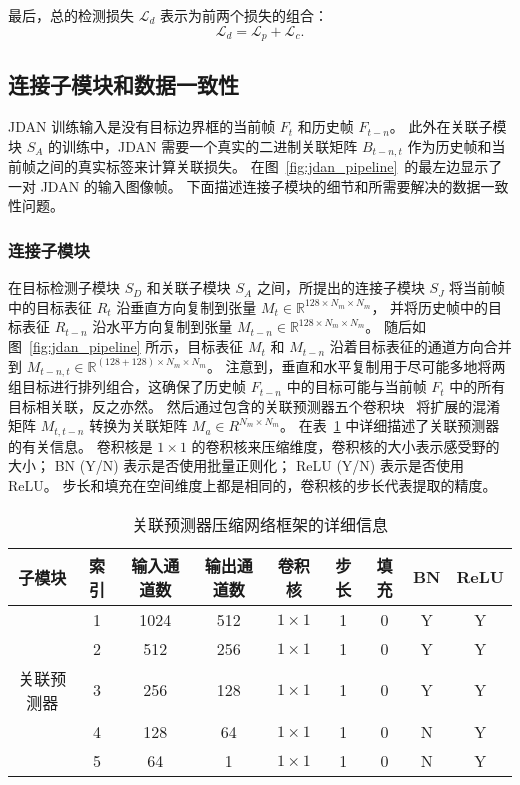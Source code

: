 最后，总的检测损失 $\mathcal{L}_{d}$ 表示为前两个损失的组合：
\begin{equation}
\mathcal{L}_{d} = \mathcal{L}_{p} + \mathcal{L}_{c}.
\end{equation}



\subsection{连接子模块和数据一致性}
JDAN 训练输入是没有目标边界框的当前帧 $F_t$ 和历史帧 $F_{t-n}$。
此外在关联子模块 $S_A$ 的训练中，JDAN 需要一个真实的二进制关联矩阵 $B_{t-n, t}$ 作为历史帧和当前帧之间的真实标签来计算关联损失。
在图~\ref{fig:jdan_pipeline}~的最左边显示了一对 JDAN 的输入图像帧。
下面描述连接子模块的细节和所需要解决的数据一致性问题。


\subsubsection{连接子模块}
在目标检测子模块 $S_D$ 和关联子模块 $S_A$ 之间，所提出的连接子模块 $S_J$ 将当前帧中的目标表征 $R_t$ 沿垂直方向复制到张量 $M_t \in \mathbb{R}^{128 \times N_m \times N_m}$，
并将历史帧中的目标表征 $R_{t-n}$ 沿水平方向复制到张量 $M_{t-n} \in \mathbb{R}^{128 \times N_m \times N_m}$。
随后如图~\ref{fig:jdan_pipeline} 所示，目标表征 $M_t$ 和 $M_{t-n}$ 沿着目标表征的通道方向合并到 $M_{t-n,t} \in \mathbb{R}^{(128 + 128) \times N_m \times N_m}$。
注意到，垂直和水平复制用于尽可能多地将两组目标进行排列组合，这确保了历史帧 $F_{t-n}$ 中的目标可能与当前帧 $F_t$ 中的所有目标相关联，反之亦然。
然后通过包含的关联预测器五个卷积块~\cite{inception} 将扩展的混淆矩阵 $M_{t,t-n}$ 转换为关联矩阵 $M_a \in R^{N_m \times N_m}$。
在表~\ref{tab:compression_net} 中详细描述了关联预测器的有关信息。
卷积核是 $1 \times 1$ 的卷积核来压缩维度，卷积核的大小表示感受野的大小； 
BN (Y/N) 表示是否使用批量正则化；
ReLU (Y/N) 表示是否使用 ReLU。
步长和填充在空间维度上都是相同的，卷积核的步长代表提取的精度。

\begin{table}[t]
	\centering
	\tabcolsep=3.5pt
	\caption{关联预测器压缩网络框架的详细信息}
	\label{tab:compression_net}
	\tabcolsep=0.15cm
	\begin{tabular}{c|cccccccc}
		\hline
		{子模块}	&{索引} &{输入通道数} &{输出通道数} &{卷积核} &{步长} & {填充} &{BN} &{ReLU} \\
		\hline
		\multirow{2}{*}{}
		&	1     & 1024  & 512  	& $1 \times 1$ 	& 1 & 0 &	Y	&	Y\\
		&	2     & 512   & 256   	& $1 \times 1$	& 1 & 0 &	Y	&	Y\\
		\multirow{1}{*}{关联预测器}
		&	3     & 256   & 128   	& $1 \times 1$ 	& 1 & 0 &	Y	&	Y\\
		\multirow{1}{*}{}
		&	4     & 128   & 64   	& $1 \times 1$ 	& 1 & 0 &	N	&	Y\\
		&	5    & 64    & 1    	& $1 \times 1$ 	& 1 & 0 &	N	&	Y\\
		\hline
	\end{tabular}%
\end{table}%


